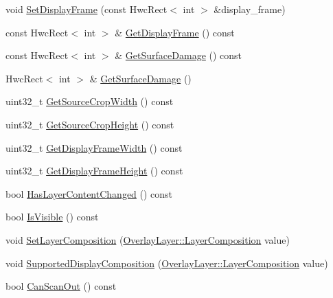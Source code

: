 \begin{DoxyCompactItemize}
\item 
void \mbox{\hyperlink{structhwcomposer_1_1OverlayLayer_adea7a64df0a33bc0139c3773eff82ef5}{Set\+Display\+Frame}} (const Hwc\+Rect$<$ int $>$ \&display\+\_\+frame)
\item 
const Hwc\+Rect$<$ int $>$ \& \mbox{\hyperlink{structhwcomposer_1_1OverlayLayer_a03a621f753c088c1bd25973adc039def}{Get\+Display\+Frame}} () const
\item 
const Hwc\+Rect$<$ int $>$ \& \mbox{\hyperlink{structhwcomposer_1_1OverlayLayer_ac2065d8c195e568d7f9db77854762a7e}{Get\+Surface\+Damage}} () const
\item 
Hwc\+Rect$<$ int $>$ \& \mbox{\hyperlink{structhwcomposer_1_1OverlayLayer_aff7c48d849492d2057e8badbf586104a}{Get\+Surface\+Damage}} ()
\item 
uint32\+\_\+t \mbox{\hyperlink{structhwcomposer_1_1OverlayLayer_aa2b5ebe5d682703e3a038f46de8aab3c}{Get\+Source\+Crop\+Width}} () const
\item 
uint32\+\_\+t \mbox{\hyperlink{structhwcomposer_1_1OverlayLayer_a8c9e307b0c311016242bff146959a7de}{Get\+Source\+Crop\+Height}} () const
\item 
uint32\+\_\+t \mbox{\hyperlink{structhwcomposer_1_1OverlayLayer_aa1a59827249a79db3168887c892a106e}{Get\+Display\+Frame\+Width}} () const
\item 
uint32\+\_\+t \mbox{\hyperlink{structhwcomposer_1_1OverlayLayer_afb99d092d3ab9597859913df69966b79}{Get\+Display\+Frame\+Height}} () const
\item 
bool \mbox{\hyperlink{structhwcomposer_1_1OverlayLayer_abf44324e238abcec12ffc034f5a320bd}{Has\+Layer\+Content\+Changed}} () const
\item 
bool \mbox{\hyperlink{structhwcomposer_1_1OverlayLayer_a48b4860962e70b714c9dff40428c7b99}{Is\+Visible}} () const
\item 
void \mbox{\hyperlink{structhwcomposer_1_1OverlayLayer_a1a318a432e36d7d01427f7c168645d23}{Set\+Layer\+Composition}} (\mbox{\hyperlink{structhwcomposer_1_1OverlayLayer_a937ae4fd43f1005ad8c0c89a9673f1e1}{Overlay\+Layer\+::\+Layer\+Composition}} value)
\item 
void \mbox{\hyperlink{structhwcomposer_1_1OverlayLayer_a32802fdf7351d051a64ae330c2fa6ec5}{Supported\+Display\+Composition}} (\mbox{\hyperlink{structhwcomposer_1_1OverlayLayer_a937ae4fd43f1005ad8c0c89a9673f1e1}{Overlay\+Layer\+::\+Layer\+Composition}} value)
\item 
bool \mbox{\hyperlink{structhwcomposer_1_1OverlayLayer_aa5b45087580b88632ed9ee0cc9a7d665}{Can\+Scan\+Out}} () const

\end{DoxyCompactItemize}
